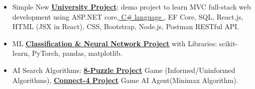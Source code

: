\begin{itemize}[itemsep=0pt, parsep=0pt, topsep=0pt]
  \item {\footnotesize Simple New \textbf{\textcolor{cyan}{\href{https://github.com/AsmaaJAH/simple-university-fullstack-web-project/tree/feature/apply_page}{ University Project}}}: demo project to learn MVC full-stack web development using ASP.NET core,{\textcolor{cyan}{\href{https://github.com/AsmaaJAH/Foundational-Csharp-with-Microsoft/tree/main}{ C\# language }}}, EF Core, SQL, React.js, HTML (JSX in React), CSS, Bootstrap, Node.js, Postman RESTful API.}
 \end{itemize}



\begin{itemize}[itemsep=0pt, parsep=0pt, topsep=0pt]
  \item{ \footnotesize ML \textbf{\textcolor{cyan}{\href{https://github.com/AsmaaJAH/Data-classifications-and-Neural-Network-using-random-data}{Classification \& Neural Network Project}}} with Libraries: scikit-learn, PyTorch, pandas, matplotlib. }
  \item {\footnotesize AI Search Algorithms: \textbf{\textcolor{cyan}{\href{https://github.com/AsmaaJAH/8_puzzle}{8-Puzzle Project}}} Game (Informed/Uninformed Algorithms), \textbf{\textcolor{cyan}{\href{https://github.com/AsmaaJAH/Connect-4-AI-Agent}{Connect-4 Project}}} Game AI Agent(Minimax Algorithm).}
 \end{itemize}


